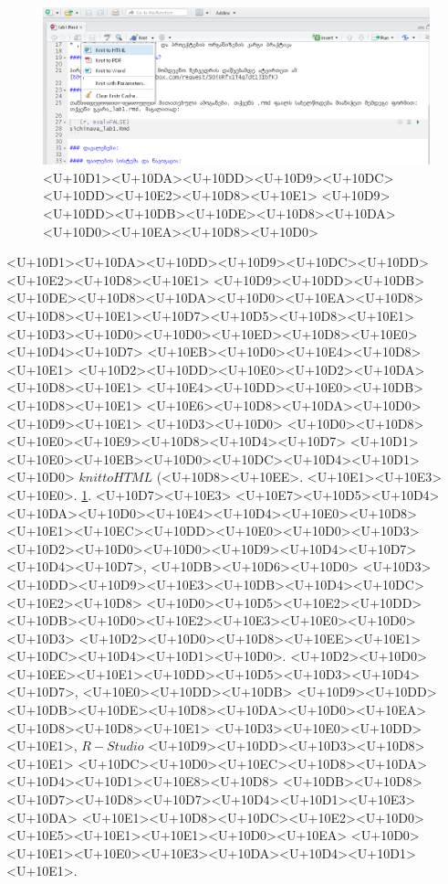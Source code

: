 \documentclass{article}
\begin{document}
\begin{figure}[h]
\centering
\includegraphics[width=\textwidth]{img/knit_to_html.PNG}
\caption{<U+10D1><U+10DA><U+10DD><U+10D9><U+10DC><U+10DD><U+10E2><U+10D8><U+10E1> <U+10D9><U+10DD><U+10DB><U+10DE><U+10D8><U+10DA><U+10D0><U+10EA><U+10D8><U+10D0>}
    \label{compile}
\end{figure}


<U+10D1><U+10DA><U+10DD><U+10D9><U+10DC><U+10DD><U+10E2><U+10D8><U+10E1> <U+10D9><U+10DD><U+10DB><U+10DE><U+10D8><U+10DA><U+10D0><U+10EA><U+10D8><U+10D8><U+10E1><U+10D7><U+10D5><U+10D8><U+10E1> <U+10D3><U+10D0><U+10D0><U+10ED><U+10D8><U+10E0><U+10D4><U+10D7> <U+10EB><U+10D0><U+10E4><U+10D8><U+10E1> <U+10D2><U+10DD><U+10E0><U+10D2><U+10DA><U+10D8><U+10E1> <U+10E4><U+10DD><U+10E0><U+10DB><U+10D8><U+10E1> <U+10E6><U+10D8><U+10DA><U+10D0><U+10D9><U+10E1> <U+10D3><U+10D0> <U+10D0><U+10D8><U+10E0><U+10E9><U+10D8><U+10D4><U+10D7> <U+10D1><U+10E0><U+10EB><U+10D0><U+10DC><U+10D4><U+10D1><U+10D0> $knit to HTML$ (<U+10D8><U+10EE>. <U+10E1><U+10E3><U+10E0>. \ref{compile}. <U+10D7><U+10E3> <U+10E7><U+10D5><U+10D4><U+10DA><U+10D0><U+10E4><U+10D4><U+10E0><U+10D8> <U+10E1><U+10EC><U+10DD><U+10E0><U+10D0><U+10D3> <U+10D2><U+10D0><U+10D0><U+10D9><U+10D4><U+10D7><U+10D4><U+10D7>, <U+10DB><U+10D6><U+10D0> <U+10D3><U+10DD><U+10D9><U+10E3><U+10DB><U+10D4><U+10DC><U+10E2><U+10D8> <U+10D0><U+10D5><U+10E2><U+10DD><U+10DB><U+10D0><U+10E2><U+10E3><U+10E0><U+10D0><U+10D3> <U+10D2><U+10D0><U+10D8><U+10EE><U+10E1><U+10DC><U+10D4><U+10D1><U+10D0>. <U+10D2><U+10D0><U+10EE><U+10E1><U+10DD><U+10D5><U+10D3><U+10D4><U+10D7>, <U+10E0><U+10DD><U+10DB> <U+10D9><U+10DD><U+10DB><U+10DE><U+10D8><U+10DA><U+10D0><U+10EA><U+10D8><U+10D8><U+10E1> <U+10D3><U+10E0><U+10DD><U+10E1>, $R-Studio$ <U+10D9><U+10DD><U+10D3><U+10D8><U+10E1> <U+10DC><U+10D0><U+10EC><U+10D8><U+10DA><U+10D4><U+10D1><U+10E8><U+10D8> <U+10DB><U+10D8><U+10D7><U+10D8><U+10D7><U+10D4><U+10D1><U+10E3><U+10DA> <U+10E1><U+10D8><U+10DC><U+10E2><U+10D0><U+10E5><U+10E1><U+10E1><U+10D0><U+10EA> <U+10D0><U+10E1><U+10E0><U+10E3><U+10DA><U+10D4><U+10D1><U+10E1>.
\end{document}
